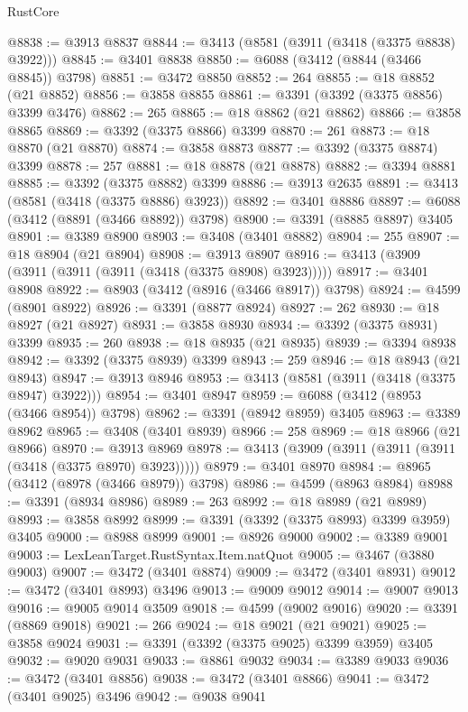 \begin{lexlean}{RustCore}
\begin{coremodule}
@8838 := @3913 @8837
@8844 := @3413 (@8581 (@3911 (@3418 (@3375 @8838) @3922)))
@8845 := @3401 @8838
@8850 := @6088 (@3412 (@8844 (@3466 @8845)) @3798)
@8851 := @3472 @8850
@8852 := 264
@8855 := @18 @8852 (@21 @8852)
@8856 := @3858 @8855
@8861 := @3391 (@3392 (@3375 @8856) @3399 @3476)
@8862 := 265
@8865 := @18 @8862 (@21 @8862)
@8866 := @3858 @8865
@8869 := @3392 (@3375 @8866) @3399
@8870 := 261
@8873 := @18 @8870 (@21 @8870)
@8874 := @3858 @8873
@8877 := @3392 (@3375 @8874) @3399
@8878 := 257
@8881 := @18 @8878 (@21 @8878)
@8882 := @3394 @8881
@8885 := @3392 (@3375 @8882) @3399
@8886 := @3913 @2635
@8891 := @3413 (@8581 (@3418 (@3375 @8886) @3923))
@8892 := @3401 @8886
@8897 := @6088 (@3412 (@8891 (@3466 @8892)) @3798)
@8900 := @3391 (@8885 @8897) @3405
@8901 := @3389 @8900
@8903 := @3408 (@3401 @8882)
@8904 := 255
@8907 := @18 @8904 (@21 @8904)
@8908 := @3913 @8907
@8916 := @3413 (@3909 (@3911 (@3911 (@3911 (@3418 (@3375 @8908) @3923)))))
@8917 := @3401 @8908
@8922 := @8903 (@3412 (@8916 (@3466 @8917)) @3798)
@8924 := @4599 (@8901 @8922)
@8926 := @3391 (@8877 @8924)
@8927 := 262
@8930 := @18 @8927 (@21 @8927)
@8931 := @3858 @8930
@8934 := @3392 (@3375 @8931) @3399
@8935 := 260
@8938 := @18 @8935 (@21 @8935)
@8939 := @3394 @8938
@8942 := @3392 (@3375 @8939) @3399
@8943 := 259
@8946 := @18 @8943 (@21 @8943)
@8947 := @3913 @8946
@8953 := @3413 (@8581 (@3911 (@3418 (@3375 @8947) @3922)))
@8954 := @3401 @8947
@8959 := @6088 (@3412 (@8953 (@3466 @8954)) @3798)
@8962 := @3391 (@8942 @8959) @3405
@8963 := @3389 @8962
@8965 := @3408 (@3401 @8939)
@8966 := 258
@8969 := @18 @8966 (@21 @8966)
@8970 := @3913 @8969
@8978 := @3413 (@3909 (@3911 (@3911 (@3911 (@3418 (@3375 @8970) @3923)))))
@8979 := @3401 @8970
@8984 := @8965 (@3412 (@8978 (@3466 @8979)) @3798)
@8986 := @4599 (@8963 @8984)
@8988 := @3391 (@8934 @8986)
@8989 := 263
@8992 := @18 @8989 (@21 @8989)
@8993 := @3858 @8992
@8999 := @3391 (@3392 (@3375 @8993) @3399 @3959) @3405
@9000 := @8988 @8999
@9001 := @8926 @9000
@9002 := @3389 @9001
@9003 := LexLeanTarget.RustSyntax.Item.natQuot
@9005 := @3467 (@3880 @9003)
@9007 := @3472 (@3401 @8874)
@9009 := @3472 (@3401 @8931)
@9012 := @3472 (@3401 @8993) @3496
@9013 := @9009 @9012
@9014 := @9007 @9013
@9016 := @9005 @9014 @3509
@9018 := @4599 (@9002 @9016)
@9020 := @3391 (@8869 @9018)
@9021 := 266
@9024 := @18 @9021 (@21 @9021)
@9025 := @3858 @9024
@9031 := @3391 (@3392 (@3375 @9025) @3399 @3959) @3405
@9032 := @9020 @9031
@9033 := @8861 @9032
@9034 := @3389 @9033
@9036 := @3472 (@3401 @8856)
@9038 := @3472 (@3401 @8866)
@9041 := @3472 (@3401 @9025) @3496
@9042 := @9038 @9041

\end{coremodule}
\end{lexlean}

